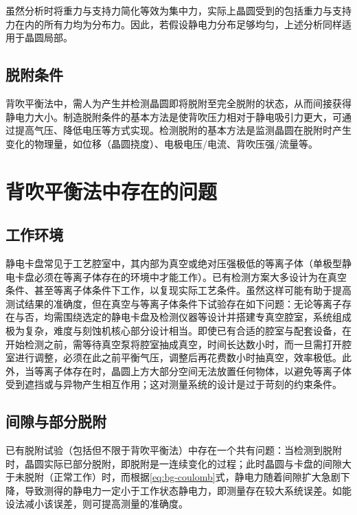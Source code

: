 虽然分析时将重力与支持力简化等效为集中力，实际上晶圆受到的包括重力与支持力在内的所有力均为分布力。因此，若假设静电力分布足够均匀，上述分析同样适用于晶圆局部。


\subsection{脱附条件}\label{sec:principle-backside-dechuck}

背吹平衡法中，需人为产生并检测晶圆即将脱附至完全脱附的状态，从而间接获得静电力大小。制造脱附条件的基本方法是使背吹压力相对于静电吸引力更大，可通过提高气压、降低电压等方式实现。检测脱附的基本方法是监测晶圆在脱附时产生变化的物理量，如位移（晶圆挠度）、电极电压/电流、背吹压强/流量等。



\clearpage



\section{背吹平衡法中存在的问题}\label{sec:principle-prob}


\subsection{工作环境}\label{sec:principle-prob-env}

静电卡盘常见于工艺腔室中，其内部为真空或绝对压强极低的等离子体（单极型静电卡盘必须在等离子体存在的环境中才能工作）。已有检测方案大多设计为在真空条件、甚至等离子体条件下工作，以复现实际工艺条件。虽然这样可能有助于提高测试结果的准确度，但在真空与等离子体条件下试验存在如下问题：无论等离子存在与否，均需围绕选定的静电卡盘及检测仪器等设计并搭建专真空腔室，系统组成极为复杂，难度与刻蚀机核心部分设计相当。即使已有合适的腔室与配套设备，在开始检测之前，需等待真空泵将腔室抽成真空，时间长达数小时，而一旦需打开腔室进行调整，必须在此之前平衡气压，调整后再花费数小时抽真空，效率极低。此外，当等离子体存在时，晶圆上方大部分空间无法放置任何物体，以避免等离子体受到遮挡或与异物产生相互作用；这对测量系统的设计是过于苛刻的约束条件。


\subsection{间隙与部分脱附}\label{principle-prob-gap}

已有脱附试验（包括但不限于背吹平衡法）中存在一个共有问题：当检测到脱附时，晶圆实际已部分脱附，即脱附是一连续变化的过程；此时晶圆与卡盘的间隙大于未脱附（正常工作）时，而根据\eqref{eq:bg-coulomb}式，静电力随着间隙扩大急剧下降，导致测得的静电力一定小于工作状态静电力，即测量存在较大系统误差。如能设法减小该误差，则可提高测量的准确度。

